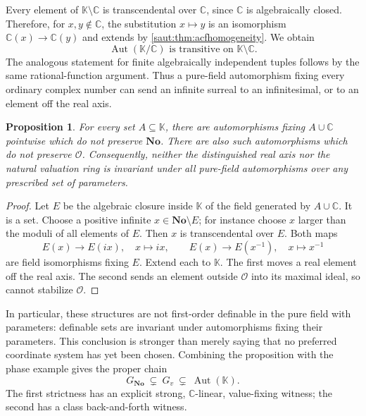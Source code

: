 \documentclass[11pt]{article}
\newtheorem{proposition}[theorem]{Proposition}
\theoremstyle{definition}
\theoremstyle{remark}
\newcommand{\No}{\mathbf{No}}
\newcommand{\C}{\mathbb C}
\newcommand{\K}{\mathbb K}
\newcommand{\OO}{\mathcal O}
\newcommand{\Aut}{\operatorname{Aut}}
\numberwithin{equation}{section}
\begin{document}
Every element of $\K\setminus\C$ is transcendental over $\C$, since $\C$
is algebraically closed. Therefore, for $x,y\notin\C$, the substitution
$x\mapsto y$ is an isomorphism $\C(x)\to\C(y)$ and extends by
\cref{saut:thm:acfhomogeneity}. We obtain
\begin{equation}\label{saut:eq:transitive}
 \Aut(\K/\C)\text{ is transitive on }\K\setminus\C.
\end{equation}
The analogous statement for finite algebraically independent tuples follows
by the same rational-function argument. Thus a pure-field automorphism
fixing every ordinary complex number can send an infinite surreal to an
infinitesimal, or to an element off the real axis.

\begin{proposition}\label{saut:prop:nondefinability}
For every set $A\subseteq\K$, there are automorphisms fixing $A\cup\C$
pointwise which do not preserve $\No$. There are also such automorphisms
which do not preserve $\OO$.
Consequently, neither the distinguished real axis nor the natural valuation
ring is invariant under all pure-field automorphisms over any prescribed
set of parameters.
\end{proposition}
\begin{proof}
Let $E$ be the algebraic closure inside $\K$ of the field generated by
$A\cup\C$. It is a set. Choose a positive infinite $x\in\No\setminus E$;
for instance choose $x$ larger than the moduli of all elements of $E$.
Then $x$ is transcendental over $E$. Both maps
\[
 E(x)\longrightarrow E(ix),\quad x\mapsto ix,
 \qquad
 E(x)\longrightarrow E(x^{-1}),\quad x\mapsto x^{-1}
\]
are field isomorphisms fixing $E$. Extend each to $\K$. The first moves a
real element off the real axis. The second sends an element outside $\OO$
into its maximal ideal, so cannot stabilize $\OO$.
\end{proof}

In particular, these structures are not first-order definable in the pure
field with parameters: definable sets are invariant under automorphisms
fixing their parameters. This conclusion is stronger than merely saying
that no preferred coordinate system has yet been chosen.
Combining the proposition with the phase example gives the proper chain
\begin{equation}\label{saut:eq:strictchain}
 G_{\No}\ \subsetneq\ G_v\ \subsetneq\ \Aut(\K).
\end{equation}
The first strictness has an explicit strong, $\C$-linear, value-fixing witness;
the second has a class back-and-forth witness.
\end{document}

